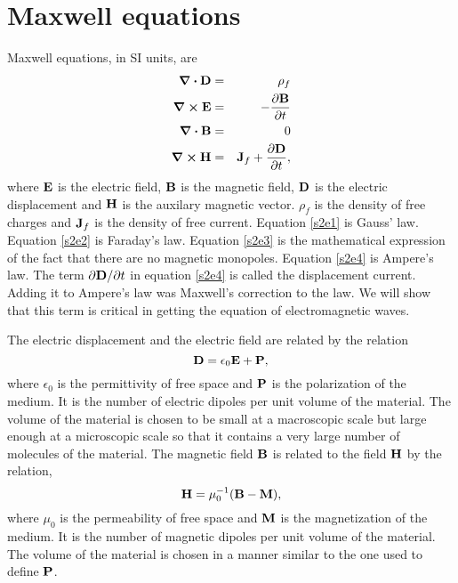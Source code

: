 \documentclass[11pt]{article}
\numberwithin{equation}{section}
\begin{document}
\section{Maxwell equations}
Maxwell equations, in SI units, are
\begin{eqnarray}
\div\vb{D} &=& \rho_f \label{s2e1} \\
\curl\vb{E} &=& -\pdv{\vb{B}}{t} \label{s2e2} \\
\div\vb{B} &=& 0 \label{s2e3} \\
\curl\vb{H} &=& \vb{J}_f + \pdv{\vb{D}}{t}, \label{s2e4}
\end{eqnarray}
where $\vb{E}$ is the electric field, $\vb{B}$ is the magnetic field,
$\vb{D}$ is the electric displacement and $\vb{H}$ is the auxilary magnetic
vector. $\rho_f$ is the density of free charges and $\vb{J}_f$ is the 
density of free current. Equation \eqref{s2e1} is Gauss' law. Equation
\eqref{s2e2} is Faraday's law. Equation \eqref{s2e3} is the mathematical
expression of the fact that there are no magnetic monopoles. Equation
\eqref{s2e4} is Ampere's law. The term $\partial\vb{D}/\partial t$ in equation
\eqref{s2e4} is called the displacement current. Adding it to Ampere's law
was Maxwell's correction to the law. We will show that this term is critical
in getting the equation of electromagnetic waves.

The electric displacement and the electric field
are related by the relation
\begin{equation}\label{s2e5}
\vb{D} = \epsilon_0\vb{E} + \vb{P},
\end{equation}
where $\epsilon_0$ is the permittivity of free space and $\vb{P}$ is the
polarization of the medium. It is the number of electric dipoles per unit
volume of the material. The volume of the material is chosen to be small at
a macroscopic scale but large enough at a microscopic scale so that it contains
a very large number of molecules of the material. The magnetic field $\vb{B}$
is related to the field $\vb{H}$ by the relation,
\begin{equation}\label{s2e6}
\vb{H} = \mu_0^{-1}(\vb{B} - \vb{M}),
\end{equation}
where $\mu_0$ is the permeability of free space and $\vb{M}$ is the 
magnetization of the medium. It is the number of magnetic dipoles per unit
volume of the material. The volume of the material is chosen in a manner 
similar to the one used to define $\vb{P}$. 
\end{document}
